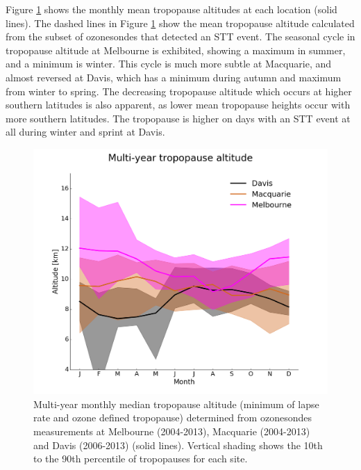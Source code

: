 \documentclass{article}
\begin{document}
    Figure \ref{fig:seasonaltpheights} shows the monthly mean tropopause altitudes at each location (solid lines).
    The dashed lines in Figure \ref{fig:seasonaltpheights} show the mean tropopause altitude calculated from the subset of ozonesondes that detected an STT event.
    The seasonal cycle in tropopause altitude at Melbourne is exhibited, showing a maximum in summer, and a minimum is winter.
    This cycle is much more subtle at Macquarie, and almost reversed at Davis, which has a minimum during autumn and maximum from winter to spring.
    The decreasing tropopause altitude which occurs at higher southern latitudes is also apparent, as lower mean tropopause heights occur with more southern latitudes.
    The tropopause is higher on days with an STT event at all during winter and sprint at Davis.

    \begin{figure}[!htbp] \begin{center}
      \includegraphics[width=0.8\columnwidth]{figures/tpheights}
      \caption{Multi-year monthly median tropopause altitude (minimum of lapse rate and ozone defined tropopause) determined from ozonesondes measurements at Melbourne (2004-2013), Macquarie (2004-2013) and Davis (2006-2013) (solid lines).
      Vertical shading shows the 10th to the 90th percentile of tropopauses for each site.
      }
      \label{fig:seasonaltpheights}
    \end{center} \end{figure}
\end{document}
